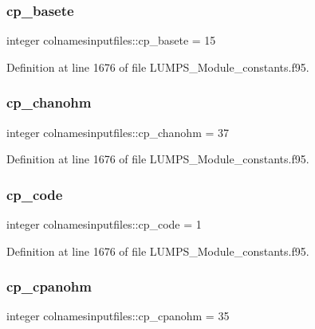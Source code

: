 \subsubsection{\texorpdfstring{cp\+\_\+basete}{cp\_basete}}
{\footnotesize\ttfamily integer colnamesinputfiles\+::cp\+\_\+basete = 15}



Definition at line 1676 of file L\+U\+M\+P\+S\+\_\+\+Module\+\_\+constants.\+f95.

\mbox{\label{namespacecolnamesinputfiles_a99f7646fb532e72d0b9ee394a0c6b959}} 
\subsubsection{\texorpdfstring{cp\+\_\+chanohm}{cp\_chanohm}}
{\footnotesize\ttfamily integer colnamesinputfiles\+::cp\+\_\+chanohm = 37}



Definition at line 1676 of file L\+U\+M\+P\+S\+\_\+\+Module\+\_\+constants.\+f95.

\mbox{\label{namespacecolnamesinputfiles_ab2ca2803ce3dfc8561661c95706214f3}} 
\subsubsection{\texorpdfstring{cp\+\_\+code}{cp\_code}}
{\footnotesize\ttfamily integer colnamesinputfiles\+::cp\+\_\+code = 1}



Definition at line 1676 of file L\+U\+M\+P\+S\+\_\+\+Module\+\_\+constants.\+f95.

\mbox{\label{namespacecolnamesinputfiles_a20049a097f86cbe9cf312c3d3878d599}} 
\subsubsection{\texorpdfstring{cp\+\_\+cpanohm}{cp\_cpanohm}}
{\footnotesize\ttfamily integer colnamesinputfiles\+::cp\+\_\+cpanohm = 35}



